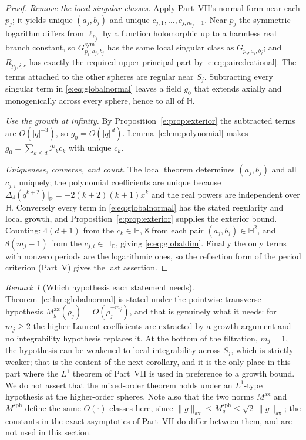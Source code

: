 \documentclass[11pt,a4paper]{article}
\numberwithin{equation}{section}
\theoremstyle{definition}
\theoremstyle{remark}
\newtheorem{remark}[theorem]{Remark}
\theoremstyle{plain}
\newcommand{\HH}{\mathbb H}
\newcommand{\HC}{\mathbb H_{\mathbb C}}
\newcommand{\RR}{\mathbb R}
\newcommand{\lap}{\Delta_4}
\newcommand{\axn}[1]{\lVert #1\rVert_{\mathrm{ax}}}   %
\newcommand{\Msph}{M^{\mathrm{sph}}}                  %
\newcommand{\Max}{M^{\mathrm{ax}}}                    %
\newcommand{\abs}[1]{\lvert #1\rvert}
\begin{document}
\begin{proof}
\emph{Remove the local singular classes.} Apply Part~VII's normal form
near each $p_j$; it yields unique $(a_j,b_j)$ and unique
$c_{j,1},\dots,c_{j,m_j-1}$. Near $p_j$ the symmetric logarithm differs
from $\ell_{p_j}$ by a function holomorphic up to a harmless real branch
constant, so $G^{\mathrm{sym}}_{p_j;a_j,b_j}$ has the same local singular
class as $G_{p_j;a_j,b_j}$; and $R_{p_j,i,c}$ has exactly the required
upper principal part by \eqref{e:eq:pairedrational}. The terms attached
to the other spheres are regular near $S_j$. Subtracting every singular
term in \eqref{e:eq:globalnormal} leaves a field $g_0$ that extends
axially and monogenically across every sphere, hence to all of $\HH$.

\emph{Use the growth at infinity.} By
Proposition~\ref{e:prop:exterior} the subtracted terms are
$O(\abs q^{-3})$, so $g_0=O(\abs q^{\,d})$. Lemma~\ref{e:lem:polynomial}
makes $g_0=\sum_{k\le d}\mathcal P_k c_k$ with unique $c_k$.

\emph{Uniqueness, converse, and count.} The local theorem determines
$(a_j,b_j)$ and all $c_{j,i}$ uniquely; the polynomial coefficients are
unique because $\lap(q^{k+2})\big|_{\RR}=-2(k+2)(k+1)x^k$ and the real
powers are independent over $\HH$. Conversely every term in
\eqref{e:eq:globalnormal} has the stated regularity and local growth, and
Proposition~\ref{e:prop:exterior} supplies the exterior bound. Counting:
$4(d+1)$ from the $c_k\in\HH$, $8$ from each pair
$(a_j,b_j)\in\HH^2$, and $8(m_j-1)$ from the $c_{j,i}\in\HC$, giving
\eqref{e:eq:globaldim}. Finally the only terms with nonzero periods are
the logarithmic ones, so the reflection form of the period criterion
(Part~V) gives the last assertion.
\end{proof}

\begin{remark}[Which hypothesis each statement needs]
\label{e:rem:globalhyp}
Theorem~\ref{e:thm:globalnormal} is stated under the pointwise
transverse hypothesis $\Max_g(\rho_j)=O(\rho_j^{-m_j})$, and that is
genuinely what it needs: for $m_j\ge2$ the higher Laurent coefficients
are extracted by a growth argument and no integrability hypothesis
replaces it. At the bottom of the filtration, $m_j=1$, the hypothesis can
be weakened to local integrability across $S_j$, which is strictly
weaker; that is the content of the next corollary, and it is the only
place in this part where the $L^1$ theorem of Part~VII is used in
preference to a growth bound. We do not assert that the mixed-order
theorem holds under an $L^1$-type hypothesis at the higher-order spheres.
Note also that the two norms $\Max$ and $\Msph$ define the same $O(\cdot)$
classes here, since $\axn g\le\Msph_g\le\sqrt2\,\axn g$; the constants in
the exact asymptotics of Part~VII do differ between them, and are not
used in this section.
\end{remark}
\end{document}
